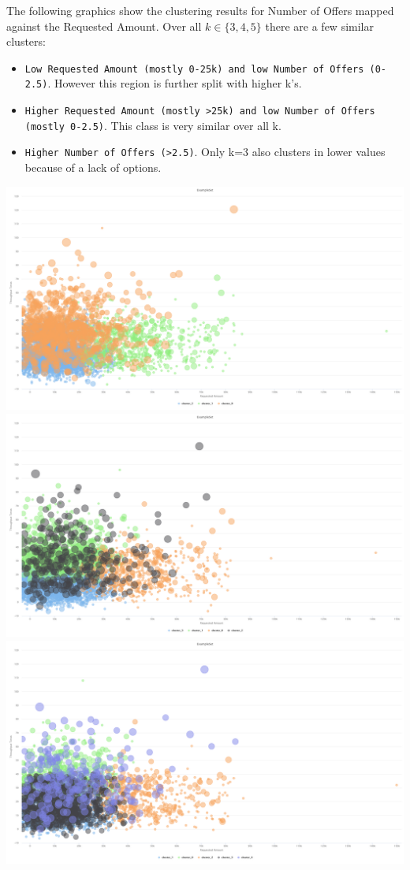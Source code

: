 \documentclass[../../main.tex]{subfiles}
\begin{document}
The following graphics show the clustering results for Number of Offers mapped against the Requested Amount. Over all $k\in\{3,4,5\}$ there are a few similar clusters:
\begin{itemize}
\item \texttt{Low Requested Amount (mostly 0-25k) and low Number of Offers (0-2.5)}. However this region is further split with higher k's.
\item \texttt{Higher Requested Amount (mostly >25k) and low Number of Offers (mostly 0-2.5)}. This class is very similar over all k.
\item \texttt{Higher Number of Offers (>2.5)}. Only k=3 also clusters in lower values because of a lack of options.
\end{itemize}
\includegraphics[width=\textwidth]{img/QUESTION_3a_kmeans_3_offers_amount.png}
\includegraphics[width=\textwidth]{img/QUESTION_3a_kmeans_4_offers_amount.png}
\includegraphics[width=\textwidth]{img/QUESTION_3a_kmeans_5_offers_amount.png}
\end{document}
